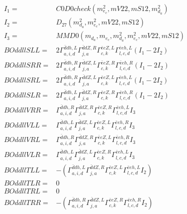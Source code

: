 \documentclass[A4,landscape]{article}
\begin{document}
\begin{align} 
I_1 = & C0D0check(m^2_{e_{{c}}}, mV22, mS12, m^2_{d_{{a}}}) \\ 
I_2 = & D_{27}(m^2_{d_{{a}}}, m^2_{e_{{c}}}, mV22, mS12) \\ 
I_3 = & MMD0(m_{d_{{a}}}, m_{e_{{c}}}, m^2_{d_{{a}}}, m^2_{e_{{c}}}, mV22, mS12) \\ 
  BOddllSLL= & 2  \Gamma^{\bar{d}d h ,L}_{a, i, d} \Gamma^{\bar{d}d Z ,R}_{j, a} \Gamma^{\bar{e}e Z ,L}_{c, k} \Gamma^{\bar{e}e h ,L}_{l, c, d} (I_1 - 2 I_2) \\ 
  BOddllSRR= & 2  \Gamma^{\bar{d}d h ,R}_{a, i, d} \Gamma^{\bar{d}d Z ,L}_{j, a} \Gamma^{\bar{e}e Z ,R}_{c, k} \Gamma^{\bar{e}e h ,R}_{l, c, d} (I_1 - 2 I_2) \\ 
  BOddllSRL= & 2  \Gamma^{\bar{d}d h ,R}_{a, i, d} \Gamma^{\bar{d}d Z ,L}_{j, a} \Gamma^{\bar{e}e Z ,L}_{c, k} \Gamma^{\bar{e}e h ,L}_{l, c, d} (I_1 - 2 I_2) \\ 
  BOddllSLR= & 2  \Gamma^{\bar{d}d h ,L}_{a, i, d} \Gamma^{\bar{d}d Z ,R}_{j, a} \Gamma^{\bar{e}e Z ,R}_{c, k} \Gamma^{\bar{e}e h ,R}_{l, c, d} (I_1 - 2 I_2) \\ 
  BOddllVRR= &  \Gamma^{\bar{d}d h ,R}_{a, i, d} \Gamma^{\bar{d}d Z ,R}_{j, a} \Gamma^{\bar{e}e Z ,R}_{c, k} \Gamma^{\bar{e}e h ,L}_{l, c, d} I_3 \\ 
  BOddllVLL= &  \Gamma^{\bar{d}d h ,L}_{a, i, d} \Gamma^{\bar{d}d Z ,L}_{j, a} \Gamma^{\bar{e}e Z ,L}_{c, k} \Gamma^{\bar{e}e h ,R}_{l, c, d} I_3 \\ 
  BOddllVRL= &  \Gamma^{\bar{d}d h ,R}_{a, i, d} \Gamma^{\bar{d}d Z ,R}_{j, a} \Gamma^{\bar{e}e Z ,L}_{c, k} \Gamma^{\bar{e}e h ,R}_{l, c, d} I_3 \\ 
  BOddllVLR= &  \Gamma^{\bar{d}d h ,L}_{a, i, d} \Gamma^{\bar{d}d Z ,L}_{j, a} \Gamma^{\bar{e}e Z ,R}_{c, k} \Gamma^{\bar{e}e h ,L}_{l, c, d} I_3 \\ 
  BOddllTLL= & -( \Gamma^{\bar{d}d h ,L}_{a, i, d} \Gamma^{\bar{d}d Z ,R}_{j, a} \Gamma^{\bar{e}e Z ,L}_{c, k} \Gamma^{\bar{e}e h ,L}_{l, c, d} I_2) \\ 
  BOddllTLR= & 0 \\ 
  BOddllTRL= & 0 \\ 
  BOddllTRR= & -( \Gamma^{\bar{d}d h ,R}_{a, i, d} \Gamma^{\bar{d}d Z ,L}_{j, a} \Gamma^{\bar{e}e Z ,R}_{c, k} \Gamma^{\bar{e}e h ,R}_{l, c, d} I_2) \\ 
\end{align} 
\end{document}
